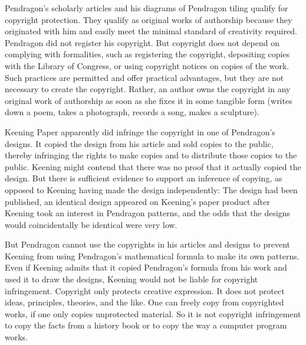 \documentclass[ignorenonframetext,aspectratio=169]{beamer}
\begin{document}
\begin{frame}{}
\protect\hypertarget{section-8}{}

Pendragon's scholarly articles and his diagrams of Pendragon tiling
qualify for copyright protection. They qualify as original works of
authorship because they originated with him and easily meet the minimal
standard of creativity required. Pendragon did not register his
copyright. But copyright does not depend on complying with formalities,
such as registering the copyright, depositing copies with the Library of
Congress, or using copyright notices on copies of the work. Such
practices are permitted and offer practical advantages, but they are not
necessary to create the copyright. Rather, an author owns the copyright
in any original work of authorship as soon as she fixes it in some
tangible form (writes down a poem, takes a photograph, records a song,
makes a sculpture).

\end{frame}

\begin{frame}{}
\protect\hypertarget{section-9}{}

Keening Paper apparently did infringe the copyright in one of
Pendragon's designs. It copied the design from his article and sold
copies to the public, thereby infringing the rights to make copies and
to distribute those copies to the public. Keening might contend that
there was no proof that it actually copied the design. But there is
sufficient evidence to support an inference of copying, as opposed to
Keening having made the design independently: The design had been
published, an identical design appeared on Keening's paper product after
Keening took an interest in Pendragon patterns, and the odds that the
designs would coincidentally be identical were very low.

\end{frame}

\begin{frame}{}
\protect\hypertarget{section-10}{}

But Pendragon cannot use the copyrights in his articles and designs to
prevent Keening from using Pendragon's mathematical formula to make its
own patterns. Even if Keening admits that it copied Pendragon's formula
from his work and used it to draw the designs, Keening would not be
liable for copyright infringement. Copyright only protects creative
expression. It does not protect ideas, principles, theories, and the
like. One can freely copy from copyrighted works, if one only copies
unprotected material. So it is not copyright infringement to copy the
facts from a history book or to copy the way a computer program works.

\end{frame}
\end{document}
